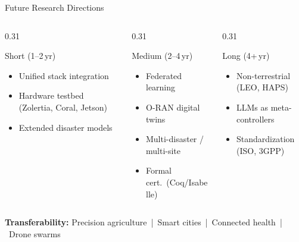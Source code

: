\documentclass[10pt,aspectratio=169]{beamer}
\begin{document}
\begin{frame}[t]{Future Research Directions}
\begin{columns}[T]
\begin{column}{0.31\textwidth}
  \begin{block}{\faCalendar\; Short (1--2\,yr)}
    \begin{itemize}\footnotesize\setlength{\itemsep}{1pt}
      \item Unified stack integration
      \item Hardware testbed (Zolertia, Coral, Jetson)
      \item Extended disaster models
    \end{itemize}
  \end{block}
\end{column}
\begin{column}{0.31\textwidth}
  \begin{block}{\faCalendar\; Medium (2--4\,yr)}
    \begin{itemize}\footnotesize\setlength{\itemsep}{1pt}
      \item Federated learning
      \item O-RAN digital twins
      \item Multi-disaster / multi-site
      \item Formal cert.\ (Coq/Isabelle)
    \end{itemize}
  \end{block}
\end{column}
\begin{column}{0.31\textwidth}
  \begin{block}{\faCalendar\; Long (4+\,yr)}
    \begin{itemize}\footnotesize\setlength{\itemsep}{1pt}
      \item Non-terrestrial (LEO, HAPS)
      \item LLMs as meta-controllers
      \item Standardization (ISO, 3GPP)
    \end{itemize}
  \end{block}
\end{column}
\end{columns}
\vspace{4pt}
{\centering\footnotesize\textbf{Transferability:} Precision agriculture~|~Smart cities~|~Connected health~|~Drone swarms\par}
\end{frame}
\end{document}

